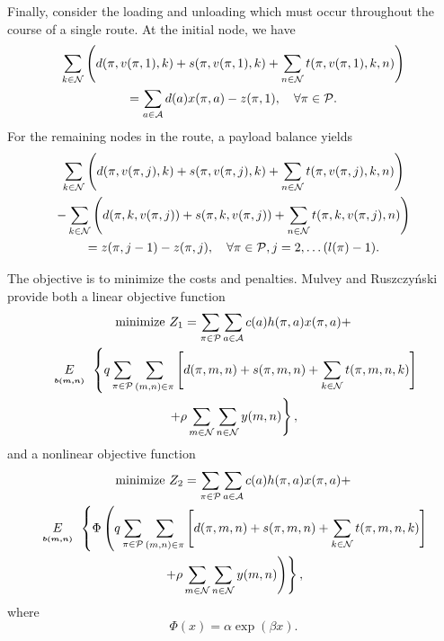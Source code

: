 Finally, consider the loading and unloading which must occur throughout the course of a single route.  At the initial node, we have
\begin{multline*}
\sum_{k \in {\cal N}} \left( d(\pi, v(\pi, 1), k) + s(\pi, v(\pi, 1), k) + \sum_{n\in {\cal N}} t(\pi, v(\pi, 1), k, n)\right)\\
 = \sum_{a\in {\cal A}} d(a) x(\pi, a) - z(\pi, 1), \quad \forall \pi \in {\cal P}.
\end{multline*}
For the remaining nodes in the route, a payload balance yields
\begin{multline*}
\sum_{k \in {\cal N}} \left( d(\pi, v(\pi, j), k) + s(\pi, v(\pi, j), k) + \sum_{n\in {\cal N}} t(\pi, v(\pi, j), k, n)\right)\\
- \sum_{k\in {\cal N}} \left( d(\pi, k, v(\pi, j)) + s(\pi, k, v(\pi,j)) + \sum_{n\in {\cal N}} t(\pi, k, v(\pi,j), n) \right)\\
= z(\pi, j-1) - z(\pi, j), \quad \forall \pi \in {\cal P}, j=2, \ldots (l(\pi) - 1).
\end{multline*}

The objective is to minimize the costs and penalties.  Mulvey and Ru\-szczy\'{n}\-ski \cite{mulvey95} provide both a linear objective function
\begin{multline*}
\text{minimize } Z_1 = \sum_{\pi \in {\cal P}} \sum_{a \in {\cal A}} c(a) h(\pi, a) x(\pi, a) + \\
\expect[b(m,n)]\left\{ q \sum_{\pi \in {\cal P}} \sum_{(m,n)\in \pi} \left[ d(\pi, m, n) + s(\pi, m, n) + \sum_{k \in {\cal N}} t(\pi, m, n, k) \right] \right.\\
\left. + \rho \sum_{m \in {\cal N}} \sum_{n \in {\cal N}} y(m,n) \right\},
\end{multline*}
and a nonlinear objective function
\begin{multline*}
\text{minimize } Z_2 =  \sum_{\pi \in {\cal P}} \sum_{a \in {\cal A}} c(a) h(\pi, a) x(\pi, a) + \\
\expect[b(m,n)]\left\{\Phi \left( q \sum_{\pi \in {\cal P}} \sum_{(m,n)\in \pi} \left[ d(\pi, m, n) + s(\pi, m, n) + \sum_{k \in {\cal N}} t(\pi, m, n, k) \right] \right. \right.\\
\left. \left. + \rho \sum_{m \in {\cal N}} \sum_{n \in {\cal N}} y(m,n) \right) \right\},
\end{multline*}
where 
\begin{equation}
\label{CARGO:phi}
\Phi(x) = \alpha \exp(\beta x).
\end{equation}



